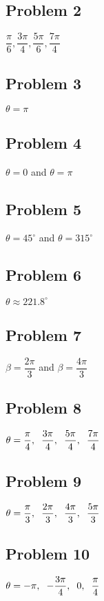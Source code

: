 \documentclass[12pt]{article}
\begin{document}
\subsection*{Problem 2}
\(\dfrac{\pi}{6},\dfrac{3\pi}{4},\dfrac{5\pi}{6},\dfrac{7\pi}{4}\)
\subsection*{Problem 3}
\(\theta=\pi\)
\subsection*{Problem 4}
\(\theta=0\) and \(\theta=\pi\)
\subsection*{Problem 5}
\(\theta=45^{\circ}\) and \(\theta=315^{\circ}\)
\subsection*{Problem 6}
\(\theta \approx 221.8^{\circ}\)
\subsection*{Problem 7}
\(\beta=\dfrac{2\pi}{3}\) and \(\beta=\dfrac{4\pi}{3}\)
\subsection*{Problem 8}
\(\theta=\dfrac{\pi}{4}, \hspace{0.2cm} \dfrac{3\pi}{4}, \hspace{0.2cm} \dfrac{5\pi}{4}, \hspace{0.2cm} \dfrac{7\pi}{4}\)
\subsection*{Problem 9}
\(\theta= \dfrac{\pi}{3}, \hspace{0.2cm} \dfrac{2\pi}{3}, \hspace{0.2cm} \dfrac{4\pi}{3}, \hspace{0.2cm} \dfrac{5\pi}{3}\)
\subsection*{Problem 10}
\(\theta=-\pi, \hspace{0.2cm} -\dfrac{3\pi}{4}, \hspace{0.2cm} 0, \hspace{0.2cm} \dfrac{\pi}{4}\)
\end{document}
